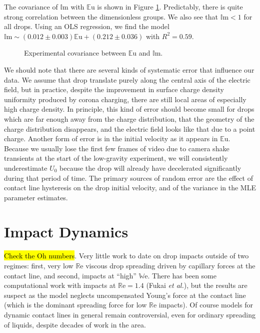 \documentclass[10pt,a4paper]{article}
\begin{document}
The covariance of $\mathbb{I}\mbox{m}$ with $\mathbb{E}\mbox{u}$ is shown in Figure \ref{fig:dnumbs}. Predictably, there is quite strong correlation between the dimensionless groups. We also see that $\mathbb{I}\mbox{m} < 1$ for all drops. Using an OLS regression, we find the model $\mathbb{I}\mbox{m} \sim (0.012 \pm 0.003) \mathbb{E}\mbox{u} + (0.212 \pm 0.036) $ with $R^2 =0.59$.
\begin{figure}[H]
    \centering
    
    \caption{Experimental covariance between $\mathbb{E}\mbox{u}$ and $\mathbb{I}\mbox{m}$.\label{fig:dnumbs}}
\end{figure}

We should note that there are several kinds of systematic error that influence our data. We assume that drop translate purely along the central axis of the electric field, but in practice, despite the improvement in surface charge density uniformity produced by corona charging, there are still local areas of especially high charge density. In principle, this kind of error should become small for drops which are far enough away from the charge distribution, that the geometry of the charge distribution disappears, and the electric field looks like that due to a point charge. Another form of error is in the initial velocity as it appears in $\mathbb{E}\mbox{u}$. Because we usually lose the first few frames of video due to camera shake transients at the start of the low-gravity experiment, we will consistently underestimate $U_0$ because the drop will already have decelerated significantly during that period of time. The primary sources of random error are the effect of contact line hysteresis on the drop initial velocity, and of the variance in the MLE parameter estimates.

\section{Impact Dynamics}
\hl{Check the Oh numbers}. Very little work to date on drop impacts outside of two regimes: first, very low $\mathbb{R}\mbox{e}$ viscous drop spreading driven by capillary forces at the contact line, and second, impacts at ``high'' $\mathbb{W}\mbox{e}$. There has been some computational work with impacts at $\mathbb{R}\mbox{e}=1.4$ (Fukai \emph{et al.}), but the results are suspect as the model neglects uncompensated Young's force at the contact line (which is the dominant spreading force for low $\mathbb{R}\mbox{e}$ impacts). Of course models for dynamic contact lines in general remain controversial, even for ordinary spreading of liquids, despite decades of work in the area. 
\end{document}
